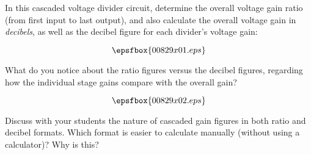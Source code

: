

In this cascaded voltage divider circuit, determine the overall voltage gain ratio (from first input to last output), and also calculate the overall voltage gain in {\it decibels}, as well as the decibel figure for each divider's voltage gain:

$$\epsfbox{00829x01.eps}$$

What do you notice about the ratio figures versus the decibel figures, regarding how the individual stage gains compare with the overall gain?







$$\epsfbox{00829x02.eps}$$







Discuss with your students the nature of cascaded gain figures in both ratio and decibel formats.  Which format is easier to calculate manually (without using a calculator)?  Why is this?




